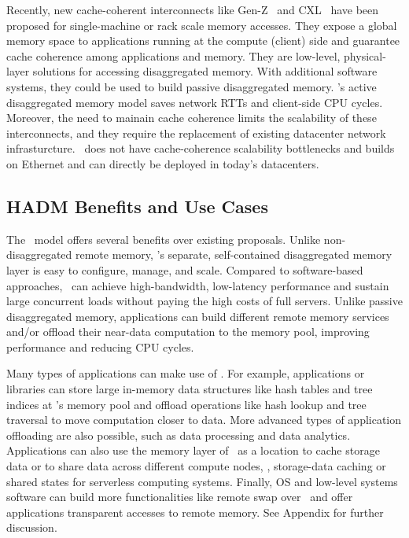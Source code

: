 Recently, new cache-coherent interconnects like Gen-Z~\cite{Genz-citation} and CXL~\cite{CXL-citation}
have been proposed for single-machine or rack scale memory accesses.
They expose a global memory space to applications running at the compute (client) 
side and guarantee cache coherence among applications and memory.
They are low-level, physical-layer solutions for accessing disaggregated memory.
With additional software systems, they could be used to build passive disaggregated memory.
\phdm's active disaggregated memory model saves network RTTs and client-side CPU cycles.
Moreover, the need to mainain cache coherence limits the scalability of these interconnects, and they require the replacement of existing datacenter network infrasturcture.
\phdm\ does not have cache-coherence scalability bottlenecks
and builds on Ethernet and can directly be deployed in today's datacenters.

\subsection{HADM Benefits and Use Cases}

The \phdm\ model offers several benefits over existing proposals. 
Unlike non-disaggregated remote memory, 
\phdm's separate, self-contained disaggregated memory layer is easy to configure, manage, and scale.
Compared to software-based approaches, 
\phdm\ can achieve 
high-bandwidth, low-latency performance 
and sustain large concurrent loads
without paying the high costs of full servers.
Unlike passive disaggregated memory,
applications can build different remote memory services and/or offload
their near-data computation to the memory pool, 
improving performance and reducing CPU cycles.

Many types of applications can make use of \phdm.
For example, applications or libraries can store large in-memory data structures 
like hash tables and tree indices at \phdm's memory pool and offload operations
like hash lookup and tree traversal to move computation closer to data.
More advanced types of application offloading are also possible, such as data 
processing and data analytics.
Applications can also use the memory layer of \phdm\ as a location to cache storage 
data or to share data across different compute nodes, 
\eg, storage-data caching or shared states for serverless computing systems.
Finally, OS and low-level systems software can build more functionalities like remote swap over \phdm\
and offer applications transparent accesses to remote memory.
See Appendix for further discussion.


